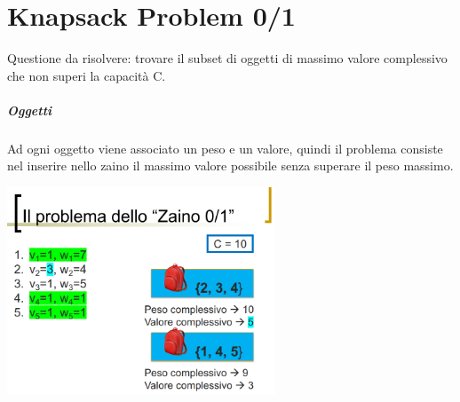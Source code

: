 \chapter{Knapsack Problem 0/1}
Questione da risolvere: trovare il subset di oggetti di massimo valore complessivo
che non superi la capacità C.
\paragraph*{Oggetti} Ad ogni oggetto viene associato un peso e un valore, quindi il problema
consiste nel inserire nello zaino il massimo valore possibile senza superare il peso massimo.
\begin{center}
    \includegraphics[width=80mm, scale=0.5]{chapters_ulerich/img/knapsack_example.png}
\end{center}
